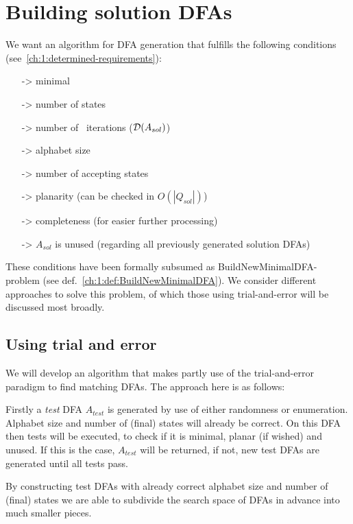 
\chapter{Building solution DFAs} \label{ch:2}

We want an algorithm for DFA generation that fulfills the following conditions (see~\ref{ch:1:determined-requirements}):
\begin{itemize}
	\item[->] minimal
	\item[->] number of states
	\item[->] number of \MinMark\ iterations ($\mathcal{D}(A_{sol})$)
	\item[->] alphabet size
	\item[->] number of accepting states
	\item[->] planarity (can be checked in $O(|Q_{sol}|)$)
	\item[->] completeness (for easier further processing)
	\item[->] $A_{sol}$ is unused (regarding all previously generated solution DFAs)
\end{itemize}
These conditions have been formally subsumed as BuildNewMinimalDFA-problem (see def.~\ref{ch:1:def:BuildNewMinimalDFA}). We consider different approaches to solve this problem, of which those using trial-and-error will be discussed most broadly. 

\section{Using trial and error}

We will develop an algorithm that makes partly use of the trial-and-error paradigm to find matching DFAs. The approach here is as follows:

Firstly a \emph{test} DFA $A_{test}$ is generated by use of either randomness or enumeration. Alphabet size and number of (final) states will already be correct. On this DFA then tests will be executed, to check if it is minimal, planar (if wished) and unused. If this is the case, $A_{test}$ will be returned, if not, new test DFAs are generated until all tests pass.

By constructing test DFAs with already correct alphabet size and number of (final) states we are able to subdivide the search space of DFAs in advance into much smaller pieces.


